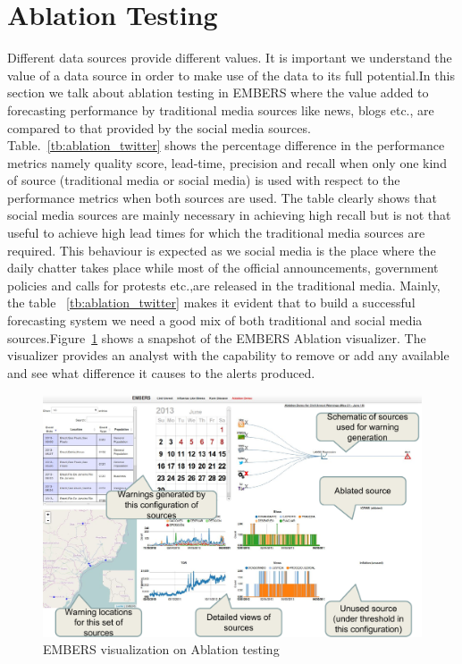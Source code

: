 \section{Ablation Testing}
Different data sources provide different values. It is important we understand the
value of a data source in order to make use of the data to its full potential.In this section
we talk about ablation testing in EMBERS where the value added to forecasting performance by traditional media
sources like news, blogs etc., are compared to that provided by the social media sources. Table.~\ref{tb:ablation_twitter}
 shows the percentage difference in the performance metrics namely quality score, lead-time, precision and recall when only one
kind of source (traditional media or social media) is used with respect to the performance metrics when both sources are used.
The table clearly shows that social media sources are mainly necessary in achieving high recall but is not that useful to achieve high
lead times for which the traditional media sources are required. This behaviour is expected as we social media is the place where the daily chatter
takes place while most of the official announcements, government policies  and calls for protests etc.,are released in the traditional media.
Mainly, the table ~\ref{tb:ablation_twitter} makes it evident that to build a successful forecasting system we need a good mix
of both traditional and social media sources.Figure~\ref{fig:ablation} shows a snapshot of the EMBERS Ablation visualizer. The visualizer provides an
analyst with the capability to remove or add any available and see what difference it causes to the alerts produced.

\begin{figure}
\includegraphics[width=\columnwidth]{figures/cu/ablation.pdf}
\caption{EMBERS visualization on Ablation testing}
\label{fig:ablation}
\end{figure}



